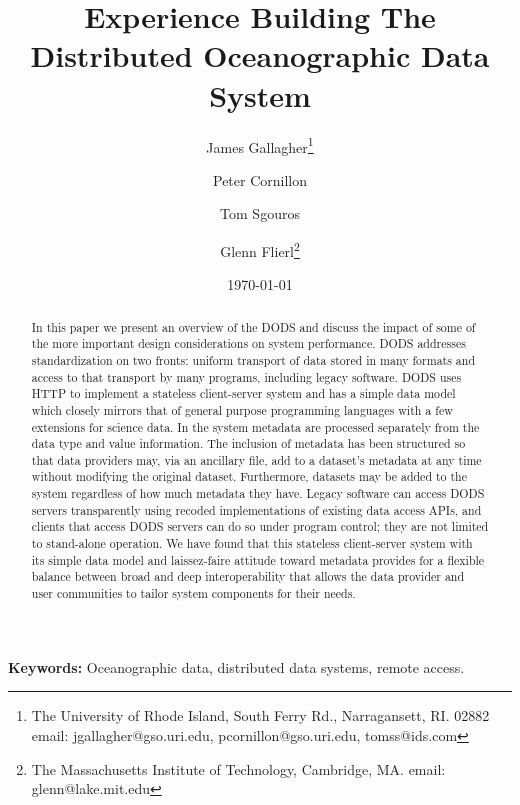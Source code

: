 \documentclass{article}
\begin{document}
\title{Experience Building The Distributed Oceanographic Data System}

\author{James Gallagher\footnote{The University of Rhode Island, South Ferry
    Rd., Narragansett, RI. 02882 email: jgallagher@gso.uri.edu,
    pcornillon@gso.uri.edu, tomss@ids.com} 
  \and Peter Cornillon\footnotemark[1]
  \and Tom Sgouros\footnotemark[1]
  \and Glenn Flierl\footnote{The Massachusetts Institute of Technology,
    Cambridge, MA. email: glenn@lake.mit.edu}}

\date{\today}

\maketitle

\begin{abstract}
  
  In this paper we present an overview of the \ac{DODS} and discuss the
  impact of some of the more important design considerations on system
  performance. \ac{DODS} addresses standardization on two fronts: uniform
  transport of data stored in many formats and access to that transport by
  many programs, including legacy software. \ac{DODS} uses \acs{HTTP} to
  implement a stateless client-server system and has a simple data model
  which closely mirrors that of general purpose programming languages with a
  few extensions for science data. In the system metadata are processed
  separately from the data type and value information. The inclusion of
  metadata has been structured so that data providers may, via an ancillary
  file, add to a dataset's metadata at any time without modifying the
  original dataset.  Furthermore, datasets may be added to the system
  regardless of how much metadata they have. Legacy software can access
  \ac{DODS} servers transparently using recoded implementations of existing
  data access \acs{API}s, and clients that access \ac{DODS} servers can do so
  under program control; they are not limited to stand-alone operation. We
  have found that this stateless client-server system with its simple data
  model and laissez-faire attitude toward metadata provides for a flexible
  balance between broad and deep interoperability that allows the data
  provider and user communities to tailor system components for their needs.
 
\end{abstract}

{\bf Keywords:} Oceanographic data, distributed data systems, remote access.
\end{document}
